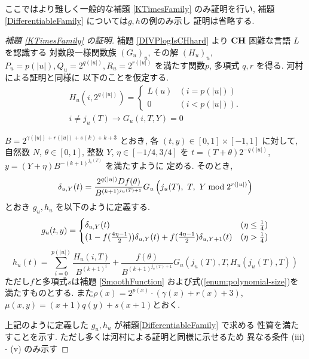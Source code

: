  ここではより難しく一般的な補題 \ref{KTimesFamily} のみ証明を行い,
 補題 \ref{DifferentiableFamily} については$g, h$の例のみ示し
 証明は省略する.
 \begin{proof}[\rm 補題 \ref{KTimesFamily} の証明]
  補題 \ref{DIVPlogIsCHhard} より
  $\mathbf{CH}$ 困難な言語 $L$ を認識する
  対数段一様関数族 $(G_u)_u$, その解 $(H_u)_u$, 
  $P_u = p(|u|), Q_u = 2^{q(|u|)}, R_u = 2^{r(|u|)}$ を満たす関数$p$, 
  多項式 $q,r$ を得る.
  河村による証明と同様に
  以下のことを仮定する.
  \begin{gather}
   H_u(i, 2^{q(|u|)}) = \begin{cases}
			L(u) & (i=p(|u|)) \\
			0 & (i<p(|u|)).
			\end{cases}
   \\
   i \not = j_u(T)  \to G_u(i, T, Y) = 0 
  \end{gather}
  

 $B = 2^{\gamma(|u|) + r(|u|) + s(k) + k + 3}$ とおき, 
 各 $(t, y) \in [0,1] \times [-1, 1]$ に対して,
 自然数 $N$, $\theta \in [0,1]$, 整数 $Y$, $\eta \in [-1/4, 3/4]$ を
 $t = (T + \theta)2^{-q(|u|)}$, $y = (Y + \eta)B^{-(k+1)^{j_u(T)}}$ を満たすように
 定める.
  そのとき,
 \begin{equation}
  \delta_{u, Y} (t) = \frac{2^{q(|u|)} D f(\theta)}{B^{(k+1)^{j_u(T)+1}}} 
   G_u\left( j_u(T),\ T,\ Y \bmod 2^{r(|u|)} \right)
 \end{equation}
 とおき $g_u, h_u$ を以下のように定義する.
 \begin{equation}
  \label{eq:gu}
\\  g_u(t,y) 
  = \begin{cases}
     \delta_{u, Y}(t)
     & (\eta \le \frac 1 4)
     \\
     ( 1-f ( \frac{4\eta-1}{2})) \delta_{u, Y}(t) 
     + f ( \frac{4\eta-1}{2}) \delta_{u,Y+1}(t)
     & (\eta > \frac 1 4)
    \end{cases}
 \end{equation}
 \begin{equation} 
  h_u(t) 
   = \sum^{p(|u|)}_{i=0} \frac{H_u(i, T)}{B^{(k+1)^i}}  
  + \frac{f(\theta)}{B^{(k+1)^{j_u(T)+1}}} G_u(j_u(T), T, H_u(j_u(T), T)) 
  \label{eq:hu}
 \end{equation}
  ただし$f$と多項式$s$は補題 \ref{SmoothFunction}
  および式(\ref{enum:polynomial-size})を満たすものとする.
  また$\rho(x) = 2^{p(x)} \cdot (\gamma(x) + r(x) + 3)$, 
  $\mu(x, y) = (x+1)q(y) + s(x+1)$とおく.


 上記のように定義した $g_u, h_u$ が補題\ref{DifferentiableFamily} で求める
 性質を満たすことを示す. ただし多くは河村による証明と同様に示せるため
  異なる条件 (iii) - (v) のみ示す
 

\end{proof}
